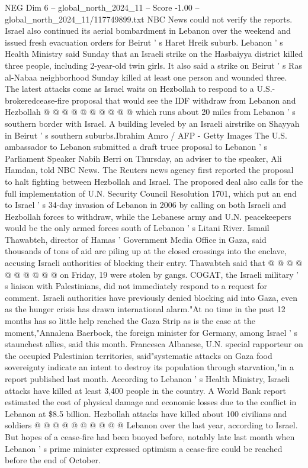 \begin{textsample}{NEG Dim 6 – global\_north\_2024\_11 – Score -1.00 – global\_north\_2024\_11/117749899.txt}
NBC News could not verify the reports.
Israel also continued its aerial bombardment in Lebanon over the weekend and issued fresh evacuation orders for Beirut ' s Haret Hreik suburb.
Lebanon ' s Health Ministry said Sunday that an Israeli strike on the Hasbaiyya district killed three people, including 2-year-old twin girls.
It also said a strike on Beirut ' s Ras al-Nabaa neighborhood Sunday killed at least one person and wounded three.
The latest attacks come as Israel waits on Hezbollah to respond to a U.S.-brokeredcease-fire proposal that would see the IDF withdraw from Lebanon and Hezbollah @ @ @ @ @ @ @ @ @ @ which runs about 20 miles from Lebanon ' s southern border with Israel.
A building leveled by an Israeli airstrike on Shayyah in Beirut ' s southern suburbs.Ibrahim Amro / AFP - Getty Images The U.S. ambassador to Lebanon submitted a draft truce proposal to Lebanon ' s Parliament Speaker Nabih Berri on Thursday, an adviser to the speaker, Ali Hamdan, told NBC News.
The Reuters news agency first reported the proposal to halt fighting between Hezbollah and Israel.
The proposed deal also calls for the full implementation of U.N.
Security Council Resolution 1701, which put an end to Israel ' s 34-day invasion of Lebanon in 2006 by calling on both Israeli and Hezbollah forces to withdraw, while the Lebanese army and U.N. peacekeepers would be the only armed forces south of Lebanon ' s Litani River.
Ismail Thawabteh, director of Hamas ' Government Media Office in Gaza, said thousands of tons of aid are piling up at the closed crossings into the enclave, accusing Israeli authorities of blocking their entry.
Thawabteh said that @ @ @ @ @ @ @ @ @ @ on Friday, 19 were stolen by gangs.
COGAT, the Israeli military ' s liaison with Palestinians, did not immediately respond to a request for comment.
Israeli authorities have previously denied blocking aid into Gaza, even as the hunger crisis has drawn international alarm."At no time in the past 12 months has so little help reached the Gaza Strip as is the case at the moment,"Annalena Baerbock, the foreign minister for Germany, among Israel ' s staunchest allies, said this month.
Francesca Albanese, U.N. special rapporteur on the occupied Palestinian territories, said"systematic attacks on Gaza food sovereignty indicate an intent to destroy its population through starvation,"in a report published last month.
According to Lebanon ' s Health Ministry, Israeli attacks have killed at least 3,400 people in the country.
A World Bank report estimated the cost of physical damage and economic losses due to the conflict in Lebanon at \$8.5 billion.
Hezbollah attacks have killed about 100 civilians and soldiers @ @ @ @ @ @ @ @ @ @ Lebanon over the last year, according to Israel.
But hopes of a cease-fire had been buoyed before, notably late last month when Lebanon ' s prime minister expressed optimism a cease-fire could be reached before the end of October.

\end{textsample}
